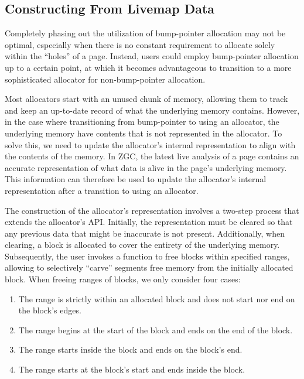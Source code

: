 
\subsection{Constructing From Livemap Data}

Completely phasing out the utilization of bump-pointer allocation may not be optimal, especially when there is no constant requirement to allocate solely within the ``holes'' of a page. Instead, users could employ bump-pointer allocation up to a certain point, at which it becomes advantageous to transition to a more sophisticated allocator for non-bump-pointer allocation.

Most allocators start with an unused chunk of memory, allowing them to track and keep an up-to-date record of what the underlying memory contains. However, in the case where transitioning from bump-pointer to using an allocator, the underlying memory have contents that is not represented in the allocator. To solve this, we need to update the allocator's internal representation to align with the contents of the memory. In ZGC, the latest live analysis of a page contains an accurate representation of what data is alive in the page's underlying memory. This information can therefore be used to update the allocator's internal representation after a transition to using an allocator.

The construction of the allocator's representation involves a two-step process that extends the allocator's API. Initially, the representation must be cleared so that any previous data that might be inaccurate is not present. Additionally, when clearing, a block is allocated to cover the entirety of the underlying memory. Subsequently, the user invokes a function to free blocks within specified ranges, allowing to selectively ``carve'' segments free memory from the initially allocated block. When freeing ranges of blocks, we only consider four cases: 

\begin{enumerate}
    \item The range is strictly within an allocated block and does not start nor end on the block's edges.
    \item The range begins at the start of the block and ends on the end of the block.
    \item The range starts inside the block and ends on the block's end.
    \item The range starts at the block's start and ends inside the block.
\end{enumerate}

